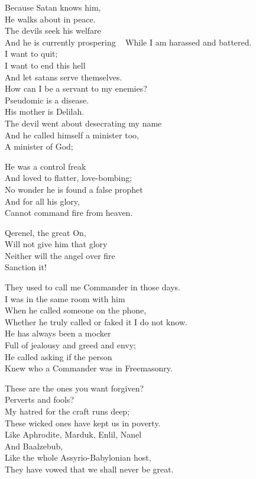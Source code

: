 \documentclass[
]{book}
\begin{document}
Because Satan knows him,\\
He walks about in peace.\\
The devils seek his welfare\\
And he is currently prospering ~
While I am harassed and battered.\\
I want to quit;\\
I want to end this hell\\
And let satans serve themselves.\\
How can I be a servant to my enemies?\\

Pseudomic is a disease.\\
His mother is Delilah.\\
The devil went about desecrating my name\\
And he called himself a minister too,\\
A minister of God;

He was a control freak\\
And loved to flatter, love-bombing;\\
No wonder he is found a false prophet\\
And for all his glory,\\
Cannot command fire from heaven.

Qerenel, the great On,\\
Will not give him that glory\\
Neither will the angel over fire\\
Sanction it!

They used to call me Commander in those days.\\
I was in the same room with him\\
When he called someone on the phone,\\
Whether he truly called or faked it I do not know.\\
He has always been a mocker\\
Full of jealousy and greed and envy;\\
He called asking if the person\\
Knew who a Commander was in Freemasonry.

These are the ones you want forgiven?\\
Perverts and fools?\\
My hatred for the craft runs deep;\\
These wicked ones have kept us in poverty.\\
Like Aphrodite, Marduk, Enlil, Nanel\\
And Baalzebub,\\
Like the whole Assyrio-Babylonian host,\\
They have vowed that we shall never be great.
\end{document}
